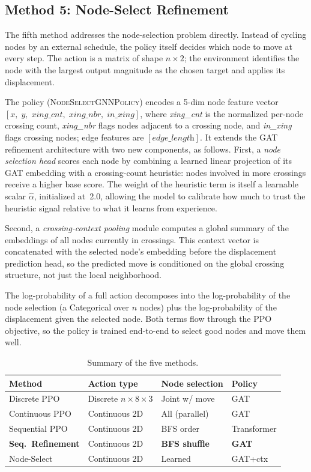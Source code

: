 \documentclass[10pt,twocolumn]{article}
\begin{document}
\subsection{Method 5: Node-Select Refinement}

The fifth method addresses the node-selection problem directly.  Instead of
cycling nodes by an external schedule, the policy itself decides which node
to move at every step.  The action is a matrix of shape $n \times 2$; the
environment identifies the node with the largest output magnitude as the
chosen target and applies its displacement.

The policy (\textsc{Node\-Select\-GNN\-Policy}) encodes a 5-dim node feature
vector $[x,\; y,\; \textit{xing\_cnt},\; \textit{xing\_nbr},\; \textit{in\_xing}]$,
where \textit{xing\_cnt} is the normalized per-node crossing count,
\textit{xing\_nbr} flags nodes adjacent to a crossing node, and
\textit{in\_xing} flags crossing nodes; edge features are $[\textit{edge\_length}]$.
It extends the GAT refinement architecture with two new components, as follows.  First, a \emph{node selection head}
scores each node by combining a learned linear projection of its GAT
embedding with a crossing-count heuristic: nodes involved in more crossings
receive a higher base score.  The weight of the heuristic term is itself a
learnable scalar $\hat\alpha$, initialized at~2.0, allowing the model to
calibrate how much to trust the heuristic signal relative to what it learns
from experience.

Second, a \emph{crossing-context pooling} module computes a global summary
of the embeddings of all nodes currently in crossings.  This context vector
is concatenated with the selected node's embedding before the displacement
prediction head, so the predicted move is conditioned on the global crossing
structure, not just the local neighborhood.

The log-probability of a full action decomposes into the log-probability of
the node selection (a Categorical over $n$ nodes) plus the log-probability
of the displacement given the selected node.  Both terms flow through the
PPO objective, so the policy is trained end-to-end to select good nodes and
move them well.

\begin{table}[t]
\centering
\caption{Summary of the five methods.}
\label{tab:methods}
\small
\setlength{\tabcolsep}{4pt}
\begin{tabular}{llll}
\toprule
Method & Action type & Node selection & Policy \\
\midrule
Discrete PPO        & Discrete $n{\times}8{\times}3$ & Joint w/ move & GAT \\
Continuous PPO      & Continuous 2D & All (parallel) & GAT \\
Sequential PPO      & Continuous 2D & BFS order      & Transformer \\
\textbf{Seq.\ Refinement} & Continuous 2D & \textbf{BFS shuffle} & \textbf{GAT} \\
Node-Select         & Continuous 2D & Learned        & GAT+ctx \\
\bottomrule
\end{tabular}
\end{table}
\end{document}
